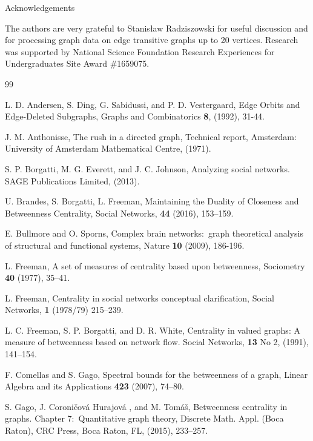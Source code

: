 \documentclass{article}%
\begin{document}
{\large Acknowledgements\bigskip}

The authors are very grateful to Stanis\l {}aw Radziszowski for useful
discussion and for processing graph data on edge transitive graphs up to 20
vertices. Research was supported by National Science Foundation Research
Experiences for Undergraduates Site Award \#1659075.

\begin{thebibliography}{99}                                                                                               %


L. D. Andersen, S. Ding, G. Sabidussi, and P. D.
Vestergaard, Edge Orbits and Edge-Deleted Subgraphs, Graphs and Combinatorics
\textbf{8}, (1992), 31-44.

J. M. Anthonisse, The rush in a directed graph, Technical
report, Amsterdam: University of Amsterdam Mathematical Centre, (1971).

S. P. Borgatti, M. G. Everett, and J. C. Johnson, Analyzing
social networks. SAGE Publications Limited, (2013).

U. Brandes, S. Borgatti, L. Freeman, Maintaining the Duality
of Closeness and Betweenness Centrality, Social Networks, \textbf{44} (2016), 153--159.

E. Bullmore and O. Sporns, Complex brain networks:\ graph
theoretical analysis of structural and functional systems, Nature \textbf{10}
(2009), 186-196.

L. Freeman, A set of measures of centrality based upon
betweenness, Sociometry \textbf{40} (1977), 35--41.

L. Freeman, Centrality in social networks conceptual
clarification, Social Networks, \textbf{1} (1978/79) 215--239.

L. C. Freeman, S. P. Borgatti, and D. R. White, Centrality
in valued graphs: A measure of betweenness based on network flow. Social
Networks, \textbf{13} No 2, (1991), 141--154.

F. Comellas and S. Gago, Spectral bounds for the betweenness
of a graph, Linear Algebra and its Applications \textbf{423} (2007), 74--80.

S. Gago, J. Coroni\v{c}ov\'{a} Hurajov\'{a} , and M.
Tom\'{a}\v{s}, Betweenness centrality in graphs. Chapter 7:\ Quantitative
graph theory, Discrete Math. Appl. (Boca Raton), CRC Press, Boca Raton, FL,
(2015), 233--257.


\end{thebibliography}
\end{document}
